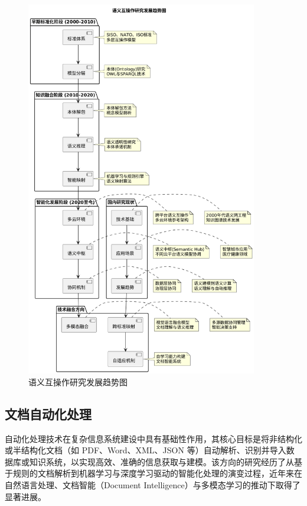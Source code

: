 \begin{figure}[H]
    \centering
    \includegraphics[width=0.9\textwidth,height=0.6\textheight,keepaspectratio]{chapters/fig-0/semantic_interop_research_trends.png}
    \caption{语义互操作研究发展趋势图}
    \label{fig_semantic_interop_research_trends}
\end{figure}


\subsection{文档自动化处理}

自动化处理技术在复杂信息系统建设中具有基础性作用，其核心目标是将非结构化或半结构化文档（如 PDF、Word、XML、JSON 等）自动解析、识别并导入数据库或知识系统，以实现高效、准确的信息获取与建模。该方向的研究经历了从基于规则的文档解析到机器学习与深度学习驱动的智能化处理的演变过程，近年来在自然语言处理、文档智能（Document Intelligence）与多模态学习的推动下取得了显著进展。

